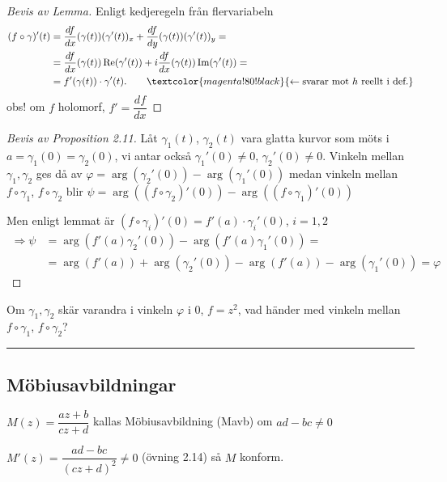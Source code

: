\begin{proof}[Bevis av Lemma]
Enligt kedjeregeln från flervariabeln
\begin{align*}
  (f \circ \gamma)'(t) &= \frac{df}{dx}(\gamma(t))(\gamma'(t))_x + \frac{df}{dy}(\gamma(t))(\gamma'(t))_y = \\
  &= \frac{df}{dx}(\gamma(t)) \operatorname{Re}(\gamma'(t)) + i\frac{df}{dx}(\gamma(t)) \operatorname{Im}(\gamma'(t)) = \\
  &= f'(\gamma(t)) \cdot \gamma'(t). \qquad \textcolor{magenta!80!black}{\leftarrow \text{svarar mot } h \text{ reellt i def.}}
\end{align*}
\textcolor{red!70!black}{obs!} om $f$ holomorf, $f' = \dfrac{df}{dx}$
\end{proof}

\begin{proof}[Bevis av Proposition 2.11]
Låt $\gamma_1(t)$, $\gamma_2(t)$ vara glatta kurvor som möts i $a = \gamma_1(0) = \gamma_2(0)$, vi antar också $\gamma_1'(0) \neq 0$, $\gamma_2'(0) \neq 0$. Vinkeln mellan $\gamma_1, \gamma_2$ ges då av $\varphi = \arg(\gamma_2'(0)) - \arg(\gamma_1'(0))$ medan vinkeln mellan $f \circ \gamma_1$, $f \circ \gamma_2$ blir $\psi = \arg((f \circ \gamma_2)'(0)) - \arg((f \circ \gamma_1)'(0))$

Men enligt lemmat är $(f \circ \gamma_i)'(0) = f'(a) \cdot \gamma_i'(0)$, $i = 1, 2$
\begin{align*}
  \Rightarrow \psi &= \arg(f'(a)\gamma_2'(0)) - \arg(f'(a)\gamma_1'(0)) = \\
  &= \arg(f'(a)) + \arg(\gamma_2'(0)) - \arg(f'(a)) - \arg(\gamma_1'(0)) = \varphi
\end{align*}
\end{proof}

\begin{note}
Om $\gamma_1, \gamma_2$ skär varandra i vinkeln $\varphi$ i $0$, $f = z^2$, vad händer med vinkeln mellan $f \circ \gamma_1$, $f \circ \gamma_2$?
\end{note}

\noindent\rule{\linewidth}{0.4pt}

\subsection{Möbiusavbildningar}
$M(z) = \dfrac{az + b}{cz + d}$ kallas Möbiusavbildning \textcolor{magenta!80!black}{(Mavb)} om $ad - bc \neq 0$

$M'(z) = \dfrac{ad - bc}{(cz + d)^2} \neq 0$ \textcolor{blue!60!black}{(övning 2.14)} så $M$ konform.

